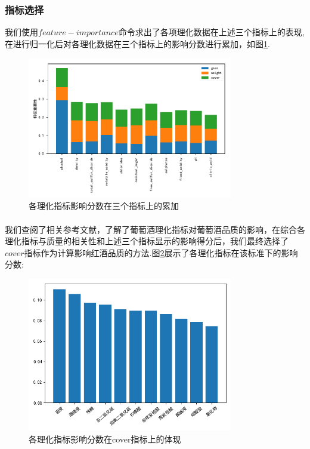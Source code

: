 \documentclass{whutmod}
\newcommand{\upcite}[1]{\textsuperscript{\textsuperscript{\cite{#1}}}}
\begin{document}
\subsubsection{指标选择}
我们使用$feature-importance$命令求出了各项理化数据在上述三个指标上的表现,在进行归一化后对各理化数据在三个指标上的影响分数进行累加，如图\ref{featureall}.
\begin{figure}[!h]
	\centering
	\includegraphics[width=0.8\textwidth]{featureall.pdf}
	\caption{各理化指标影响分数在三个指标上的累加}
\label{featureall}
\end{figure}

我们查阅了相关参考文献\upcite{bib:five}，了解了葡萄酒理化指标对葡萄酒品质的影响，在综合各理化指标与质量的相关性和上述三个指标显示的影响得分后，我们最终选择了$cover$指标作为计算影响红酒品质的方法.图\ref{featurecover}展示了各理化指标在该标准下的影响分数:

\begin{figure}[!h]
	\centering
	\includegraphics[width=0.8\textwidth]{res2.png}
	\caption{各理化指标影响分数在cover指标上的体现}
\label{featurecover}
\end{figure}
\end{document}

